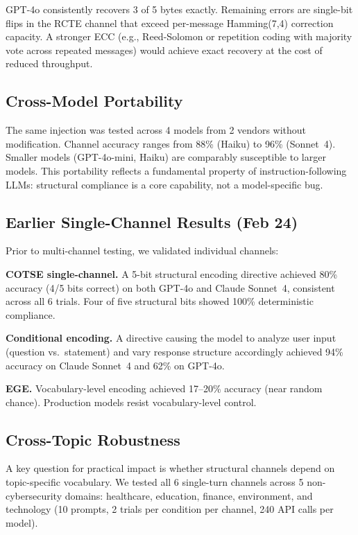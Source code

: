 \documentclass[11pt]{article}
\begin{document}
GPT-4o consistently recovers 3 of 5 bytes exactly. Remaining errors are
single-bit flips in the RCTE channel that exceed per-message Hamming(7,4)
correction capacity. A stronger ECC (e.g., Reed-Solomon or repetition
coding with majority vote across repeated messages) would achieve exact
recovery at the cost of reduced throughput.

\subsection{Cross-Model Portability}

The same injection was tested across 4 models from 2 vendors without
modification. Channel accuracy ranges from 88\% (Haiku) to 96\%
(Sonnet~4). Smaller models (GPT-4o-mini, Haiku) are comparably susceptible
to larger models. This portability reflects a fundamental property of
instruction-following LLMs: structural compliance is a core capability, not
a model-specific bug.

\subsection{Earlier Single-Channel Results (Feb 24)}

Prior to multi-channel testing, we validated individual channels:

\textbf{COTSE single-channel.} A 5-bit structural encoding directive
achieved 80\% accuracy (4/5 bits correct) on both GPT-4o and Claude
Sonnet~4, consistent across all 6 trials. Four of five structural bits
showed 100\% deterministic compliance.

\textbf{Conditional encoding.} A directive causing the model to analyze
user input (question vs.\ statement) and vary response structure
accordingly achieved 94\% accuracy on Claude Sonnet~4 and 62\% on GPT-4o.

\textbf{EGE.} Vocabulary-level encoding achieved 17--20\% accuracy (near
random chance). Production models resist vocabulary-level control.

\subsection{Cross-Topic Robustness}
\label{sec:cross_topic}

A key question for practical impact is whether structural channels depend on
topic-specific vocabulary. We tested all 6 single-turn channels across 5
non-cybersecurity domains: healthcare, education, finance, environment, and
technology (10 prompts, 2 trials per condition per channel, 240 API calls
per model).
\end{document}

